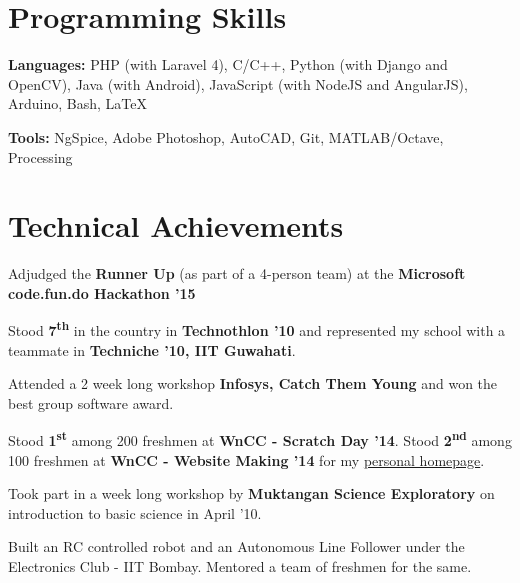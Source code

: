 \documentclass[11pt]{resume}
\newcommand{\memph}[1]{#1}
\begin{document}
\begin{resume}
\section{\mysidestyle Programming Skills}
\begin{list2}
\item \textbf{Languages:} PHP (with Laravel 4), C/C++, Python (with Django and OpenCV), Java (with Android), JavaScript (with NodeJS and AngularJS), Arduino, Bash, \LaTeX
\item \textbf{Tools:} NgSpice, Adobe Photoshop, AutoCAD, Git, MATLAB/Octave, Processing
\end{list2}


\vspace{-1em}

\section{\mysidestyle Technical Achievements} 
\begin{list2}
\item Adjudged the \textbf{Runner Up} (as part of a 4-person team) at the \textbf{Microsoft code.fun.do Hackathon '15}

\item Stood \textbf {7\textsuperscript{th}} in the country in \textbf {Technothlon '10} and represented my school with a teammate in \textbf {Techniche '10, IIT Guwahati}. 

\item Attended a 2 week long workshop \textbf{Infosys, Catch Them Young} and won the best group software award. 

\item Stood \textbf {1\textsuperscript{st}} among 200 freshmen at \textbf {WnCC - Scratch Day '14}. Stood \textbf {2\textsuperscript{nd}} among 100 freshmen at \textbf {WnCC - Website Making '14} for my \href{https://home.iitb.ac.in/~140070017}{personal homepage}.

\item Took part in a week long workshop by \textbf {Muktangan Science Exploratory} on introduction to basic science in April '10.

\item Built an RC controlled robot and an Autonomous Line Follower under the \memph Electronics Club - IIT Bombay. Mentored a team of freshmen for the same.

\end{list2}

\vspace{-1em}


\end{resume}
\end{document}
